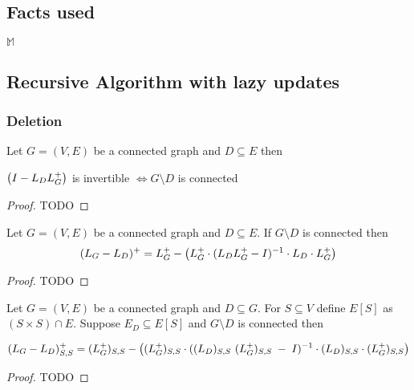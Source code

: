\subsection{Facts used}

\begin{HXf}
 $\mathbb{M}$
\end{HXf}




\subsection{Recursive Algorithm with lazy updates}




\subsubsection{Deletion}

\begin{HXl}
  Let $G=(V,E)$ be a connected graph and $D \subseteq E$ then  
  
  $\left( I - L_D L_{G}^{+} \right)$ is invertible $\iff G \setminus D$ is connected 
  
\end{HXl}

\begin{proof}
 TODO
\end{proof}




\begin{HXt} 
 Let $G=(V,E)$ be a connected graph and $D \subseteq E$. If $G \setminus D$ is connected then 
$$ (L_G - L_D)^+ = L_{G}^{+} - \left( L_{G}^{+} \cdot (L_DL_{G}^{+}-I)^{-1} \cdot L_D \cdot L_{G}^{+}\right)$$
\end{HXt}

\begin{proof}
 TODO
\end{proof}

\begin{HXd}[Submatrix]
 
\end{HXd}


\begin{HXc}
  Let $G=(V,E)$ be a connected graph and $D \subseteq G$. For $S \subseteq V$ define $ E[S] $ as $(S \times S) \cap E$. Suppose $E_D \subseteq E[S]$ and  $G \setminus D$ is connected then 
  
  $$ (L_G - L_D)_{S,S}^+ = (L_{G}^{+})_{S,S} - \left( (L_{G}^{+})_{S,S} \cdot ((L_D)_{S,S} \  (L_{G}^{+})_{S,S} \; - \; I)^{-1} \cdot (L_D)_{S,S} \cdot (L_{G}^{+})_{S,S} \right) $$ 
  
\end{HXc}
\begin{proof}
 TODO
\end{proof}

